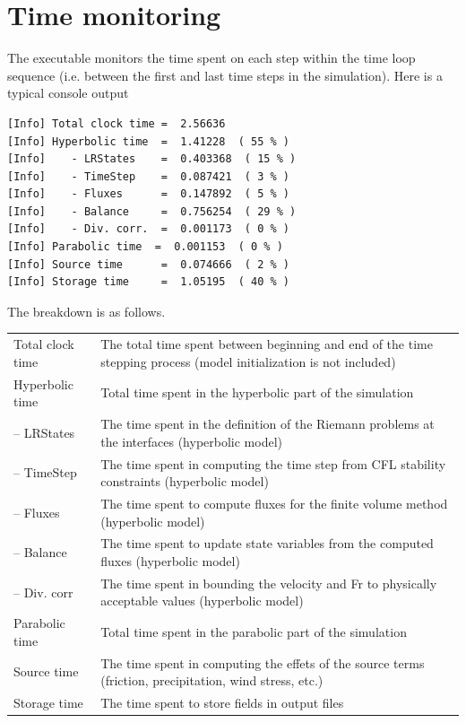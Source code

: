 \section{Time monitoring}
The \swSolver executable monitors the time spent on each step within the time loop sequence (i.e. between the first and last time steps in the simulation). Here is a typical console output

\begin{lstlisting}
[Info] Total clock time =  2.56636 
[Info] Hyperbolic time  =  1.41228  ( 55 % ) 
[Info]    - LRStates    =  0.403368  ( 15 % ) 
[Info]    - TimeStep    =  0.087421  ( 3 % ) 
[Info]    - Fluxes      =  0.147892  ( 5 % ) 
[Info]    - Balance     =  0.756254  ( 29 % ) 
[Info]    - Div. corr.  =  0.001173  ( 0 % ) 
[Info] Parabolic time  =  0.001153  ( 0 % ) 
[Info] Source time      =  0.074666  ( 2 % ) 
[Info] Storage time     =  1.05195  ( 40 % )
\end{lstlisting}

The breakdown is as follows.\\
\begin{tabular}{p{3cm} p{11cm}}
Total clock time & The total time spent between beginning and end of the time stepping process (model initialization is not included)\\
Hyperbolic time & Total time spent in the hyperbolic part of the simulation\\
\;\; --  LRStates & The time spent in the definition of the Riemann problems at the interfaces (hyperbolic model)\\
\;\; --  TimeStep & The time spent in computing the time step from CFL stability constraints (hyperbolic model)\\
\;\; --  Fluxes & The time spent to compute fluxes for the finite volume method (hyperbolic model)\\
\;\; --  Balance & The time spent to update state variables from the computed fluxes (hyperbolic model)\\
\;\; --  Div. corr & The time spent in bounding the velocity and Fr to physically acceptable values (hyperbolic model)\\
Parabolic time & Total time spent in the parabolic part of the simulation\\
Source time& The time spent in computing the effets of the source terms (friction, precipitation, wind stress, etc.)\\
Storage time& The time spent to store fields in output files
\end{tabular}

